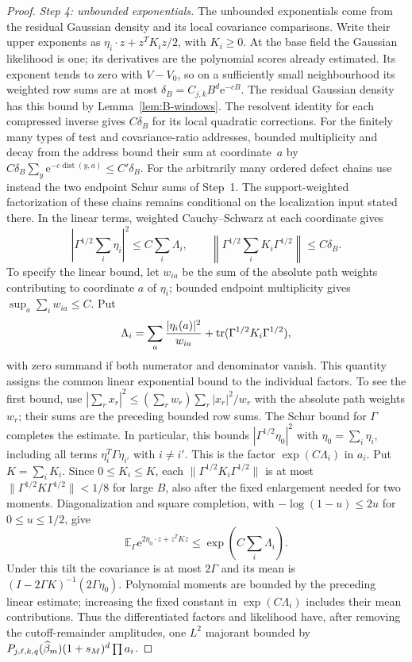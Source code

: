 \begin{proof}
\emph{Step 4: unbounded exponentials.} The unbounded exponentials come from the residual Gaussian density and its local covariance comparisons. Write their upper exponents as $\eta_i\cdot z+z^TK_i z/2$, with $K_i\ge0$. At the base field the Gaussian likelihood is one; its derivatives are the polynomial scores already estimated. Its exponent tends to zero with $V-V_0$, so on a sufficiently small neighbourhood its weighted row sums are at most $\delta_B=C_{j,k}B^d \mathrm e^{-cB}$. The residual Gaussian density has this bound by Lemma~\ref{lem:B-windows}. The resolvent identity for each compressed inverse gives $C\delta_B$ for its local quadratic corrections. For the finitely many types of test and covariance-ratio addresses, bounded multiplicity and decay from the address bound their sum at coordinate~$a$ by $C\delta_B\sum_y\mathrm e^{-c\operatorname{dist}(y,a)}\le C'\delta_B$. For the arbitrarily many ordered defect chains use instead the two endpoint Schur sums of Step~1. The support-weighted factorization of these chains remains conditional on the localization input stated there. In the linear terms, weighted Cauchy--Schwarz at each coordinate gives
\begin{equation*}
\left|\Gamma^{1/2}\sum_i\eta_i\right|^2
 \le C\sum_i\Lambda_i,\qquad
\left\|\Gamma^{1/2}\sum_iK_i\Gamma^{1/2}\right\|\le C\delta_B.
\end{equation*}
To specify the linear bound, let $w_{ia}$ be the sum of the absolute path weights contributing to coordinate $a$ of $\eta_i$; bounded endpoint multiplicity gives $\sup_a\sum_i w_{ia}\le C$. Put
\begin{equation*}
\Lambda_i=\sum_a\frac{|\eta_i(a)|^2}{w_{ia}}+\operatorname{tr}(\Gamma^{1/2}K_i\Gamma^{1/2}),
\end{equation*}
with zero summand if both numerator and denominator vanish. This quantity assigns the common linear exponential bound to the individual factors. To see the first bound, use $|\sum_r x_r|^2\le(\sum_r w_r)\sum_r|x_r|^2/w_r$ with the absolute path weights $w_r$; their sums are the preceding bounded row sums. The Schur bound for $\Gamma$ completes the estimate. In particular, this bounds $|\Gamma^{1/2}\eta_0|^2$ with $\eta_0=\sum_i\eta_i$, including all terms $\eta_i^T\Gamma\eta_{i'}$ with $i\ne i'$. This is the factor $\exp(C\Lambda_i)$ in $a_i$. Put $K=\sum_iK_i$. Since $0\le K_i\le K$, each $\|\Gamma^{1/2}K_i\Gamma^{1/2}\|$ is at most $\|\Gamma^{1/2}K\Gamma^{1/2}\|<1/8$ for large $B$, also after the fixed enlargement needed for two moments.
Diagonalization and square completion, with $-\log(1-u)\le2u$ for $0\le u\le1/2$, give
\begin{equation*}
\mathbb E_\Gamma \mathrm e^{2\eta_0\cdot z+z^TKz}
 \le\exp\!\left(C\sum_i\Lambda_i\right).
\end{equation*}
Under this tilt the covariance is at most $2\Gamma$ and its mean is $(I-2\Gamma K)^{-1}(2\Gamma\eta_0)$. Polynomial moments are bounded by the preceding linear estimate; increasing the fixed constant in $\exp(C\Lambda_i)$ includes their mean contributions.
Thus the differentiated factors and likelihood have, after removing the cutoff-remainder amplitudes, one $L^2$ majorant bounded by $P_{j,\ell,k,q}(\widehat{\beta}_m)(1+s_M)^d\prod a_i$.


\end{proof}
